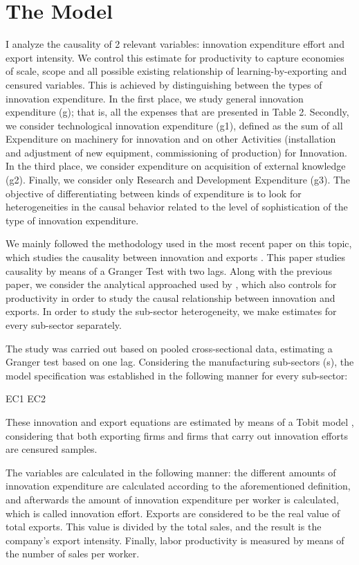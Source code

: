 \section{The Model}
I analyze the causality of 2 relevant variables: innovation expenditure effort and export intensity. We control this estimate for productivity to capture economies of scale, scope and all possible existing relationship of learning-by-exporting and censured variables. This is achieved by distinguishing between the types of innovation expenditure. In the first place, we study general innovation expenditure (g); that is, all the expenses that are presented in Table 2. Secondly, we consider technological innovation expenditure (g1), defined as the sum of all Expenditure on machinery for innovation and on other Activities (installation and adjustment of new equipment, commissioning of production) for Innovation. In the third place, we consider expenditure on acquisition of external knowledge (g2). Finally, we consider only Research and Development Expenditure (g3). The objective of differentiating between kinds of expenditure is to look for heterogeneities in the causal behavior related to the level of sophistication of the type of innovation expenditure.

We mainly followed the methodology used in the most recent paper on this topic, which studies the causality between innovation and exports  \citep{Filipescu2013}. This paper studies causality by means of a Granger Test \citep{Granger} with two lags. Along with the previous paper, we consider the analytical approached used by \cite{MonrealPerez2012}, which also controls for productivity in order to study the causal relationship between innovation and exports. In order to study the sub-sector heterogeneity, we make estimates for every sub-sector separately.

The study was carried out based on pooled cross-sectional data, estimating a Granger test based on one lag. Considering the manufacturing sub-sectors (s), the model specification was established in the following manner for every sub-sector:

EC1
EC2

These innovation and export equations are estimated by means of a Tobit model \citep{Amemiya}, considering that both exporting firms and firms that carry out innovation efforts are censured samples.

The variables are calculated in the following manner: the different amounts of innovation expenditure are calculated according to the aforementioned definition, and afterwards the amount of innovation expenditure per worker is calculated, which is called innovation effort. Exports are considered to be the real value of total exports. This value is divided by the total sales, and the result is the company's export intensity. Finally, labor productivity is measured by means of the number of sales per worker. 

